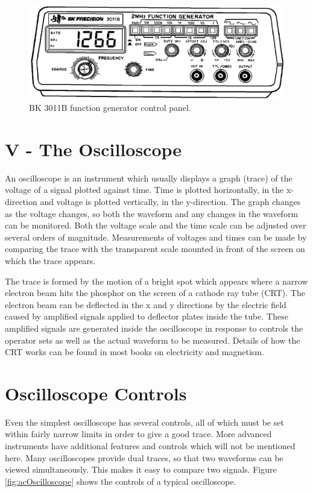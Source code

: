 \begin{figure}
\includegraphics{AC-Measurements-func-gen.png}
\caption{BK 3011B function generator control panel.}
\label{fig:acFG}
\end{figure}

\section{{\bf V - The Oscilloscope}}

An oscilloscope is an instrument which usually displays a graph (trace) of the voltage of a signal plotted against time. Time is plotted horizontally, in the x-direction and voltage is plotted vertically, in the y-direction. The graph changes as the voltage changes, so both the waveform and any changes in the waveform can be monitored. Both the voltage scale and the time scale can be adjusted over several orders of magnitude. Measurements of voltages and times can be made by comparing the trace with the transparent scale mounted in front of the screen on which the trace appears. 

The trace is formed by the motion of a bright spot which appears where a narrow electron beam hits the phosphor on the screen of a cathode ray tube (CRT). The electron beam can be deflected in the x and y directions by the electric field caused by amplified signals applied to deflector plates inside the tube. These amplified signals are generated inside the oscilloscope in response to controls the operator sets as well as the actual waveform to be measured. Details of how the CRT works can be found in most books on electricity and magnetism.

\section{{\bf Oscilloscope Controls}}

Even the simplest oscilloscope has several controls, all of which must be set within fairly narrow limits in order to give a good trace. More advanced instruments have additional features and controls which will not be mentioned here. Many oscilloscopes provide dual traces, so that two waveforms can be viewed simultaneously. This makes it easy to compare two signals. Figure \ref{fig:acOscilloscope} shows the controls of a typical oscilloscope.

